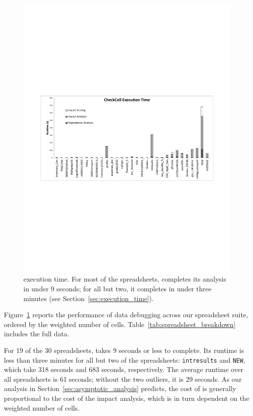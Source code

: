 \begin{figure}[!t]
\centering
\includegraphics[width=5.5in]{execution_time_graph}
  \caption{\checkcell{} execution time. For most of the spreadsheets, \checkcell{} completes its analysis in under 9 seconds; for all but two, it completes in under three minutes (see Section~\ref{sec:execution_time}).\label{fig:execution_time_graph}}
\end{figure}
 
Figure~\ref{fig:execution_time_graph} reports the performance of data
debugging across our spreadsheet suite, ordered by the weighted number
of cells. Table~\ref{tab:spreadsheet_breakdown} includes the full data.

For 19 of the 30 spreadsheets, \checkcell{} takes 9 seconds or less to
complete. Its runtime is less than three minutes for all but two of
the spreadsheets: \texttt{intresults} and \texttt{NEW}, which take 318
seconds and 683 seconds, respectively. The average runtime over all
spreadsheets is 61 seconds; without the two outliers, it is 29
seconds. As our analysis in Section~\ref{sec:asymptotic_analysis}
predicts, the cost of \checkcell{} is generally proportional to the
cost of the impact analysis, which is in turn dependent on the
weighted number of cells.

